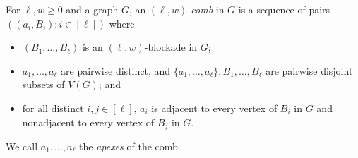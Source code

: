 \documentclass[11pt,reqno,a4paper]{amsart}
\newcommand{\LL}{,\ldots,}
\begin{document}
	For $\ell,w\ge0$ and a graph $G$,
	an {\em $(\ell,w)$-comb} in $G$ is a sequence of pairs $((a_i,B_i):i\in[\ell])$ where
	\begin{itemize}
		\item $(B_1,\ldots,B_{\ell})$ is an $(\ell,w)$-blockade in $G$;
		
		\item $a_1,\ldots,a_\ell$ are pairwise distinct, and $\{a_1,\ldots,a_\ell\},B_1,\ldots,B_\ell$ are pairwise disjoint subsets of $V(G)$; and
		
		\item for all distinct $i,j\in[\ell]$, $a_i$ is adjacent to every vertex of $B_i$ in $G$ and nonadjacent to every vertex of $B_j$ in $G$.
	\end{itemize}
	We call $a_1\LL a_\ell$ the {\em apexes} of the comb.
	
\end{document}
